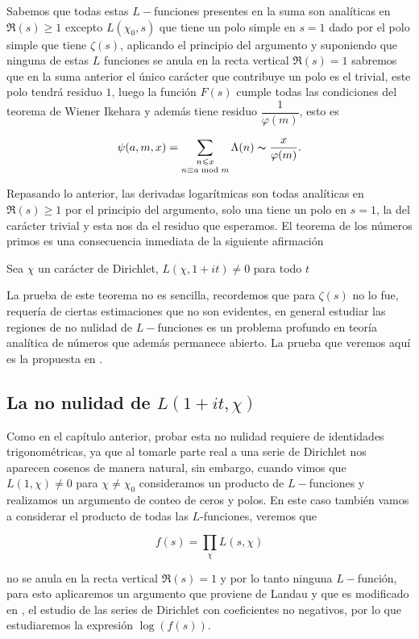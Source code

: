Sabemos que todas estas $L-$funciones presentes en la suma son analíticas en $\Re(s)\geq 1$ excepto $L(\chi_0,s)$ que tiene un polo simple en $s=1$ dado por el polo simple que tiene $\zeta(s)$, aplicando el principio del argumento y suponiendo que ninguna de estas $L$ funciones se anula en la recta vertical $\Re(s)=1$ sabremos que en la suma anterior el único carácter que contribuye un polo es el trivial, este polo tendrá residuo $1$, luego la función $F(s)$ cumple todas las condiciones del teorema de Wiener Ikehara y además tiene residuo $\dfrac{1}{\varphi(m)}$, esto es

$$\psi(a,m,x)=\sum_{\substack{n\leq x\\n\equiv a\bmod{m}}}\Lambda(n)\thicksim \frac{x}{\varphi(m)}.$$

Repasando lo anterior, las derivadas logarítmicas son todas analíticas en $\Re(s)\geq 1$ por el principio del argumento, solo una tiene un polo en $s=1$, la del carácter trivial y esta nos da el residuo que esperamos. El teorema de los números primos es una consecuencia inmediata de la siguiente afirmación
\begin{theorem}
    Sea $\chi$ un carácter de Dirichlet, $L(\chi,1+it)\neq 0$  para todo $t$
\end{theorem}

La prueba de este teorema no es sencilla, recordemos que para $\zeta(s)$ no lo fue, requería de ciertas estimaciones que no son evidentes, en general estudiar las regiones de no nulidad de $L-$funciones es un problema profundo en teoría analítica de números que además permanece abierto. La prueba que veremos aquí es la propuesta en \cite{murty2007problems}.

\subsection{La no nulidad de \texorpdfstring{$L(1+it,\chi)$ }{Lg}}

Como en el capítulo anterior, probar esta no nulidad requiere de identidades trigonométricas, ya que al tomarle parte real a una serie de Dirichlet nos aparecen cosenos de manera natural, sin embargo, cuando vimos que $L(1,\chi)\neq 0$ para $\chi\neq\chi_0$ consideramos un producto de $L-$funciones y realizamos un argumento de conteo de ceros y polos. En este caso también vamos a considerar el producto de todas las $L$-funciones, veremos que

$$f(s)=\prod_\chi L(s,\chi)$$ 

no se anula en la recta vertical $\Re(s)=1$ y por lo tanto ninguna $L-$función, para esto aplicaremos un argumento que proviene de Landau y que es modificado en \cite{murty2007problems}, el estudio de las series de Dirichlet con coeficientes no negativos, por lo que estudiaremos la expresión $\log(f(s))$.\\

